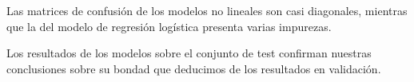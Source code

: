 \documentclass[a4]{article}
\begin{document}
Las matrices de confusión de los modelos no lineales son casi diagonales, mientras que la del modelo de regresión logística presenta varias impurezas.

Los resultados de los modelos sobre el conjunto de test confirman nuestras conclusiones sobre su bondad que deducimos de los resultados en validación.
\end{document}
